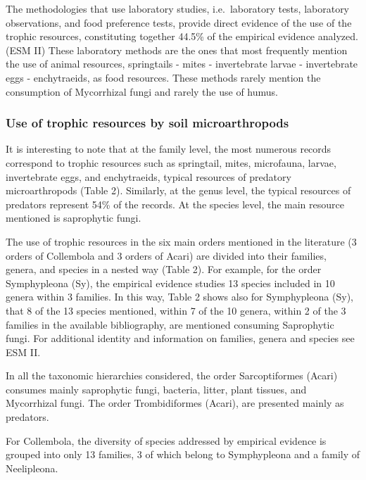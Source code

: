 \documentclass[10pt,oneside]{article}
\begin{document}
The methodologies that use laboratory studies, i.e.~laboratory tests,
laboratory observations, and food preference tests, provide direct
evidence of the use of the trophic resources, constituting together
44.5\% of the empirical evidence analyzed. (ESM II) These laboratory
methods are the ones that most frequently mention the use of animal
resources, springtails - mites - invertebrate larvae - invertebrate eggs
- enchytraeids, as food resources. These methods rarely mention the
consumption of Mycorrhizal fungi and rarely the use of humus.

\hypertarget{use-of-trophic-resources-by-soil-microarthropods}{%
\subsubsection{Use of trophic resources by soil
microarthropods}\label{use-of-trophic-resources-by-soil-microarthropods}}

It is interesting to note that at the family level, the most numerous
records correspond to trophic resources such as springtail, mites,
microfauna, larvae, invertebrate eggs, and enchytraeids, typical
resources of predatory microarthropods (Table 2). Similarly, at the
genus level, the typical resources of predators represent 54\% of the
records. At the species level, the main resource mentioned is
saprophytic fungi.

The use of trophic resources in the six main orders mentioned in the
literature (3 orders of Collembola and 3 orders of Acari) are divided
into their families, genera, and species in a nested way (Table 2). For
example, for the order Symphypleona (Sy), the empirical evidence studies
13 species included in 10 genera within 3 families. In this way, Table 2
shows also for Symphypleona (Sy), that 8 of the 13 species mentioned,
within 7 of the 10 genera, within 2 of the 3 families in the available
bibliography, are mentioned consuming Saprophytic fungi. For additional
identity and information on families, genera and species see ESM II.

In all the taxonomic hierarchies considered, the order Sarcoptiformes
(Acari) consumes mainly saprophytic fungi, bacteria, litter, plant
tissues, and Mycorrhizal fungi. The order Trombidiformes (Acari), are
presented mainly as predators.

For Collembola, the diversity of species addressed by empirical evidence
is grouped into only 13 families, 3 of which belong to Symphypleona and
a family of Neelipleona.
\end{document}
